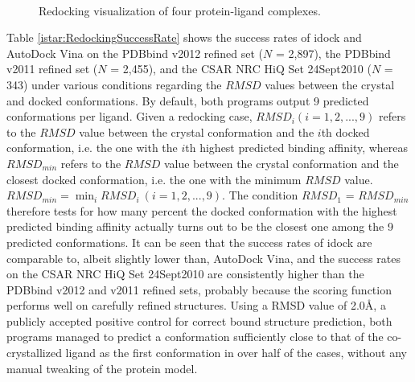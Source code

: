 \begin{figure}
\centering
{}
\\
\caption{Redocking visualization of four protein-ligand complexes.}
\label{istar:RedockingVisualization}
\end{figure}

Table \ref{istar:RedockingSuccessRate} shows the success rates of idock and AutoDock Vina on the PDBbind v2012 refined set ($N$ = 2,897), the PDBbind v2011 refined set ($N$ = 2,455), and the CSAR NRC HiQ Set 24Sept2010 ($N$ = 343) under various conditions regarding the $RMSD$ values between the crystal and docked conformations. By default, both programs output 9 predicted conformations per ligand. Given a redocking case, $RMSD_i (i = 1,2,...,9)$ refers to the $RMSD$ value between the crystal conformation and the $i$th docked conformation, i.e. the one with the $i$th highest predicted binding affinity, whereas $RMSD_{min}$ refers to the $RMSD$ value between the crystal conformation and the closest docked conformation, i.e. the one with the minimum $RMSD$ value. $RMSD_{min} = \displaystyle\min_{i}RMSD_i\ (i = 1,2,...,9)$. The condition $RMSD_1$ = $RMSD_{min}$ therefore tests for how many percent the docked conformation with the highest predicted binding affinity actually turns out to be the closest one among the 9 predicted conformations. It can be seen that the success rates of idock are comparable to, albeit slightly lower than, AutoDock Vina, and the success rates on the CSAR NRC HiQ Set 24Sept2010 are consistently higher than the PDBbind v2012 and v2011 refined sets, probably because the scoring function performs well on carefully refined structures. Using a RMSD value of 2.0\AA, a publicly accepted positive control for correct bound structure prediction, both programs managed to predict a conformation sufficiently close to that of the co-crystallized ligand as the first conformation in over half of the cases, without any manual tweaking of the protein model.

